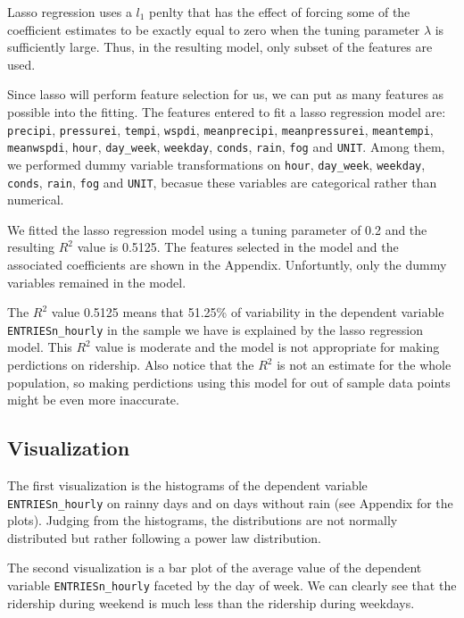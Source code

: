 \documentclass{article}
\begin{document}
Lasso regression uses a $l_1$ penlty that has the effect of forcing some
of the coefficient estimates to be exactly equal to zero when the tuning
parameter $\lambda$ is sufficiently large. Thus, in the resulting model,
only subset of the features are used.

Since lasso will perform feature selection for us, we can put as many
features as possible into the fitting. The features entered to fit a
lasso regression model are: \texttt{precipi}, \texttt{pressurei},
\texttt{tempi}, \texttt{wspdi}, \texttt{meanprecipi},
\texttt{meanpressurei}, \texttt{meantempi}, \texttt{meanwspdi},
\texttt{hour}, \texttt{day\_week}, \texttt{weekday}, \texttt{conds},
\texttt{rain}, \texttt{fog} and \texttt{UNIT}. Among them, we performed
dummy variable transformations on \texttt{hour}, \texttt{day\_week},
\texttt{weekday}, \texttt{conds}, \texttt{rain}, \texttt{fog} and
\texttt{UNIT}, becasue these variables are categorical rather than
numerical.

We fitted the lasso regression model using a tuning parameter of 0.2 and
the resulting $R^2$ value is 0.5125. The features selected in the model
and the associated coefficients are shown in the Appendix. Unfortuntly,
only the dummy variables remained in the model.

The $R^2$ value 0.5125 means that 51.25\% of variability in the
dependent variable \texttt{ENTRIESn\_hourly} in the sample we have is
explained by the lasso regression model. This $R^2$ value is moderate
and the model is not appropriate for making perdictions on ridership.
Also notice that the $R^2$ is not an estimate for the whole population,
so making perdictions using this model for out of sample data points
might be even more inaccurate.

    \subsection{Visualization}\label{visualization}

The first visualization is the histograms of the dependent variable
\texttt{ENTRIESn\_hourly} on rainny days and on days without rain (see
Appendix for the plots). Judging from the histograms, the distributions
are not normally distributed but rather following a power law
distribution.

The second visualization is a bar plot of the average value of the
dependent variable \texttt{ENTRIESn\_hourly} faceted by the day of week.
We can clearly see that the ridership during weekend is much less than
the ridership during weekdays.
\end{document}
